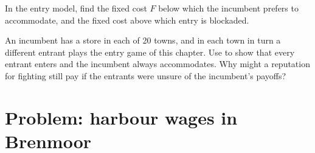 \begin{exercise}[$\star\star\star$]\label{exo:b2:dynamic-games:11}
In the entry model, find the fixed cost $F$ below which the incumbent prefers to accommodate, and the fixed cost
above which entry is blockaded.
\end{exercise}

\begin{exercise}[$\star\star\star$]\label{exo:b2:dynamic-games:12}
An incumbent has a store in each of 20 towns, and in each town in turn a different entrant plays the entry game
of this chapter. Use  to show that every entrant enters and the incumbent always
accommodates. Why might a reputation for fighting still pay if the entrants were unsure of the incumbent's
payoffs?
\end{exercise}

\section{Problem: harbour wages in Brenmoor}\label{sec:b2:dynamic-games:problem}

